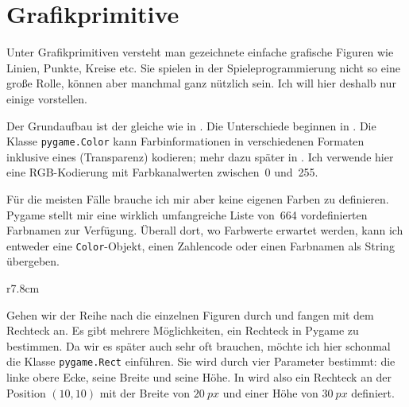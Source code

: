\newpage
\section{Grafikprimitive}

Unter Grafikprimitiven versteht man gezeichnete einfache grafische Figuren wie Linien, Punkte, Kreise etc. Sie spielen in der Spieleprogrammierung nicht so eine große Rolle, können aber manchmal ganz nützlich sein. Ich will hier deshalb nur einige vorstellen. 


Der Grundaufbau ist der gleiche wie in . Die Unterschiede beginnen in . Die Klasse \texttt{pygame.Color} kann Farbinformationen in verschiedenen Formaten inklusive eines  (Transparenz) kodieren; mehr dazu später in . Ich verwende hier eine RGB-Kodierung mit Farbkanalwerten zwischen~0 und~255. 

Für die meisten Fälle brauche ich mir aber keine eigenen Farben zu definieren. Pygame stellt mir eine wirklich umfangreiche Liste von~664 vordefinierten Farbnamen zur Verfügung. Überall dort, wo Farbwerte erwartet werden, kann ich entweder eine \texttt{Color}-Objekt, einen Zahlencode oder einen Farbnamen als String übergeben.

\begin{wrapfigure}[18]{r}{7.8cm}%
	\begin{center}%
		\vspace{-1cm}%
	\end{center}%
\end{wrapfigure}%
Gehen wir der Reihe nach die einzelnen Figuren durch und fangen mit dem Rechteck an. Es gibt mehrere Möglichkeiten, ein Rechteck in Pygame zu bestimmen. Da wir es später auch sehr oft brauchen, möchte ich hier schonmal die Klasse \texttt{pygame.Rect} einführen. Sie wird durch vier Parameter bestimmt: die linke obere Ecke, seine Breite und seine Höhe. In  wird also ein Rechteck an der Position $(10,10)$ mit der Breite von $20~px$ und einer Höhe von $30~px$ definiert. 

